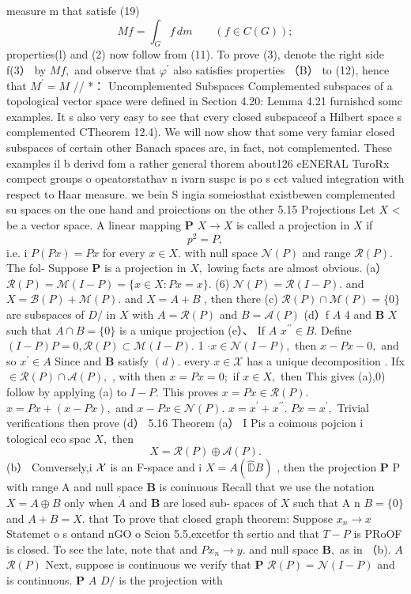 measure m that satisfe (19) $$ M f=\int_{G}f\,d m\qquad(f\in C(G)); $$ properties(l) and (2) now follow from (11). To prove (3), denote the right side f(3） by $M f,$ and observe that $\varphi^{\prime}$ also satisfies properties （B） to (12), hence that $M^{\prime}=M$ // *： Uncomplemented Subspaces Complemented subspaces of a topological vector space were defined in Section 4.20: Lemma 4.21 furnishcd somc examples. It s also very easy to see that cvery closed subspaceof a Hilbert space s complemented CTheorem 12.4). We will now show that some very famiar closed subspaces of certain other Banach spaces are, in fact, not complemented. These examples il b derivd fom a rather general thorem about126 cENERAL TuroRx compect groups o opeatorstathav n ivarn suspc is po s cct valued integration with respect to Haar measure. we bein S ingia someiosthat existbewen complemented su spaces on the one hand and proiections on the other 5.15 Projections Let $\textstyle X$ < be a vector space. A linear mapping $\boldsymbol{P}$ $X\to X$ is called a projection in $\textstyle X$ if $$ p^{2}=P, $$ i.e. i $P(P x)=P x$ for every $x\in X.$ with null space ${\mathcal{N}}(P)$ and range ${\mathcal{R}}(P).$ The fol- Suppose ${\boldsymbol{P}}$ is a projection in $X,$ lowing facts are almost obvious. (a） ${\mathcal{R}}(P)={\mathcal{M}}(I-P)=\{x\in X\colon P x=x\}.$ (6) $\mathcal{N}(P)=\mathcal{R}(I-P).$ and $X={\mathcal{B}}(P)+{\mathcal{M}}(P).$ and $X=A+B$ , then there (c) $\mathcal{R}(P)\cap\mathcal{M}(P)=\{0\}$ are subspaces of $D\!\!\!\!/$ in $\textstyle X$ with $A={\mathcal{R}}(P)$ and $B=\mathcal{A}(P)$ (d）f $\textstyle A$ 4 and $\boldsymbol{B}$ $\textstyle X$ such that $A\cap B=\{0\}$ is a unique projection (e）、 If $\textstyle A$ $x^{\prime\prime}\in B.$ Define $(I-P)P=0,{\mathcal{R}}(P)\subset{\mathcal{M}}(I-P).$ 1 $\cdot x\in{\mathcal{N}}(I-P),$ then $x-P x-0,$ and so $x^{\prime}\in A$ Since and $\boldsymbol{B}$ satisfy $\scriptstyle(d).$ every $x\in{\mathcal{X}}$ has a unique decomposition . Ifx $\in{\mathcal{R}}(P)\cap{\mathcal{A}}(P),$ , with then $x=P x=0;$ if $x\in X,$ then This gives (a),0) follow by applying (a) to $I-P.$ This proves $x=P x\in{\mathcal{R}}(P).$ $x=P x+(x-P x),$ and $x-P x\in{\mathcal{N}}(P).$ $x=x^{\prime}+x^{\prime\prime}.$ $P x=x^{\prime},$ Trivial verifications then prove (d） 5.16 Theorem (a） I Pis a coimous pojcion i tological eco spac $X,$ then $$ X={\mathcal{R}}(P)\oplus{\mathcal{A}}(P). $$ (b） Comversely,i $\textstyle{\cal{X}}$ is an F-space and i $X=A\left(\hat{\mathbb{D}}B\right)$ , then the projection ${\boldsymbol{P}}$ P with range A and null space $\boldsymbol{B}$ is coninuous Recall that we use the notation $X=A\oplus B$ only when $\dot{A}$ and $\boldsymbol{B}$ are losed sub- spaces of $X$ such that A n $B=\{0\}$ and $A+B=X.$ that To prove that closed graph theorem: Suppose $x_{n}\to x$ Statemet o s ontand nGO o Scion 5.5,excetfor th sertio and that $\scriptstyle{T-P}$ is PRoOF is closed. To see the late, note that and $P x_{n}\to y.$ and null space ${\boldsymbol{B}},$ as in （b). $\textstyle A$ ${\mathcal{R}}(P)$ Next, suppose is continuous we verify that $\boldsymbol{P}$ ${\mathcal{R}}(P)={\mathcal{N}}(I-P)$ and is continuous. $\boldsymbol{P}$ $\textstyle A$ $D\!\!\!\!/$ is the projection with 